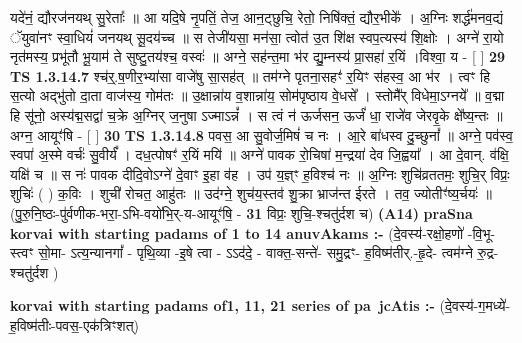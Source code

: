 \documentclass[17pt]{extarticle}
\begin{document}
                  यदे॑नं॒ द्यौरज॑नयथ् सु॒रेताः᳚ ॥ आ यदि॒षे नृ॒पतिं॒ तेज॒ आन॒ट्छुचि॒ रेतो॒ निषि॑क्तं॒ द्यौर॒भीके᳚ । अ॒ग्निः शर्द्ध॑मनव॒द्यं ॅयुवा॑नꣳ स्वा॒धियं॑ जनयथ् सू॒दय॑च्च ॥ स तेजी॑यसा॒ मन॑सा॒ त्वोत॑ उ॒त शि॑क्ष स्वप॒त्यस्य॑ शि॒क्षोः । अग्ने॑ रा॒यो नृत॑मस्य॒ प्रभू॑तौ भू॒याम॑ ते सुष्टु॒तय॑श्च॒ वस्वः॑ ॥ अग्ने॒ सह॑न्त॒मा भ॑र द्यु॒म्नस्य॑ प्रा॒सहा॑ र॒यिं ।विश्वा॒ य - [ ] \textbf{  29} \newline
                  \newline
                                \textbf{ TS 1.3.14.7} \newline
                  श्च॑र्॒.ष॒णीर॒भ्या॑सा वाजे॑षु सा॒सह॑त् ॥ तम॑ग्ने पृतना॒सहꣳ॑ र॒यिꣳ स॑हस्व॒ आ भ॑र । त्वꣳ हि स॒त्यो अद्भु॑तो दा॒ता वाज॑स्य॒ गोम॑तः ॥ उ॒क्षान्ना॑य व॒शान्ना॑य॒ सोम॑पृष्ठाय वे॒धसे᳚ । स्तोमै᳚र् विधेमा॒ऽग्नये᳚ ॥ व॒द्मा हि सू॑नो॒ अस्य॑द्म॒सद्वा॑ च॒क्रे अ॒ग्निर् ज॒नुषा ऽज्माऽन्नं᳚ । स त्वं न॑ ऊर्जसन॒ ऊर्जं॑ धा॒ राजे॑व जेरवृ॒के क्षे᳚ष्य॒न्तः ॥ अग्न॒ आयूꣳ॑षि - [ ] \textbf{  30} \newline
                  \newline
                                \textbf{ TS 1.3.14.8} \newline
                  पवस॒ आ सु॒वोर्ज॒मिषं॑ च नः । आ॒रे बा॑धस्व दु॒च्छुनां᳚ ॥ अग्ने॒ पव॑स्व॒ स्वपा॑ अ॒स्मे वर्चः॑ सु॒वीर्यं᳚ । दध॒त्पोषꣳ॑ र॒यिं मयि॑ ॥ अग्ने॑ पावक रो॒चिषा॑ म॒न्द्रया॑ देव जि॒ह्वया᳚ । आ दे॒वान्. व॑क्षि॒ यक्षि॑ च ॥ स नः॑ पावक दीदि॒वोऽग्ने॑ दे॒वाꣳ इ॒हा व॑ह । उप॑ य॒ज्ञ्ꣳ ह॒विश्च॑ नः ॥ अ॒ग्निः शुचि॑व्रततमः॒ शुचि॒र् विप्रः॒ शुचिः॑ ( ) क॒विः । शुची॑ रोचत॒ आहु॑तः ॥ उद॑ग्ने॒ शुच॑य॒स्तव॑ शु॒क्रा भ्राज॑न्त ईरते । तव॒ ज्योतीꣳ॑ष्य॒र्चयः॑ ॥(पु॒रु॒नि॒ष्ठः-पु॑र्वणीक-भरा॒-ऽभि-वयो॑भि॒र्-य-आयूꣳ॑षि॒ - \textbf{  31} \newline
                  \newline
                      विप्रः॒ शुचि॒-श्चतु॑र्दश च)  \textbf{(A14)} \newline \newline
                \textbf{praSna korvai with starting padams of 1 to 14 anuvAkams :-} \newline
        (दे॒वस्य॑-रक्षो॒हणो॑ -वि॒भू-स्त्वꣳ सो॒मा- ऽत्य॒न्यानगां᳚ - पृथि॒व्या -इ॒षे त्वा - ऽऽद॑दे॒ - वाक्त॒-सन्ते॑- समु॒द्रꣳ- ह॒विष्म॑तीर्.-हृ॒दे- त्वम॑ग्ने रु॒द्र-श्चतु॑र्दश ) \newline

        \textbf{korvai with starting padams of1, 11, 21 series of pa~jcAtis :-} \newline
        (दे॒वस्य॑-ग॒मध्ये॑-ह॒विष्म॑तीः-पवस॒-एक॑त्रिꣳशत्) \newline
\end{document}
